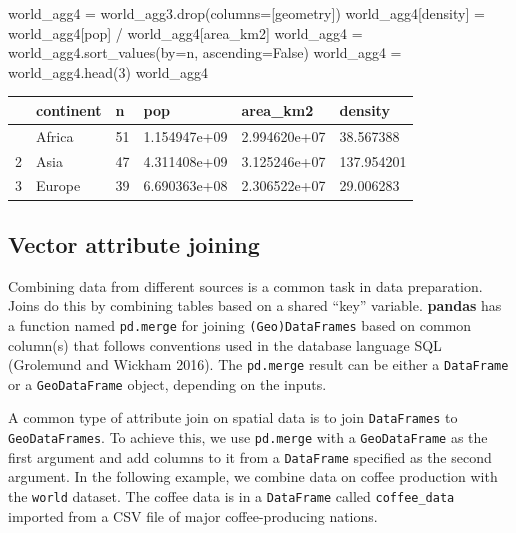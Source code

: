 \documentclass[
  letterpaper,
]{krantz}
\newenvironment{Shaded}{\begin{snugshade}}{\end{snugshade}}
\newcommand{\DecValTok}[1]{\textcolor[rgb]{0.68,0.00,0.00}{#1}}
\newcommand{\NormalTok}[1]{\textcolor[rgb]{0.00,0.23,0.31}{#1}}
\newcommand{\OperatorTok}[1]{\textcolor[rgb]{0.37,0.37,0.37}{#1}}
\newcommand{\StringTok}[1]{\textcolor[rgb]{0.13,0.47,0.30}{#1}}
\newcommand{\VariableTok}[1]{\textcolor[rgb]{0.07,0.07,0.07}{#1}}
\begin{document}
\begin{Shaded}
\begin{Highlighting}[]
\NormalTok{world\_agg4 }\OperatorTok{=}\NormalTok{ world\_agg3.drop(columns}\OperatorTok{=}\NormalTok{[}\StringTok{\textquotesingle{}geometry\textquotesingle{}}\NormalTok{])}
\NormalTok{world\_agg4[}\StringTok{\textquotesingle{}density\textquotesingle{}}\NormalTok{] }\OperatorTok{=}\NormalTok{ world\_agg4[}\StringTok{\textquotesingle{}pop\textquotesingle{}}\NormalTok{] }\OperatorTok{/}\NormalTok{ world\_agg4[}\StringTok{\textquotesingle{}area\_km2\textquotesingle{}}\NormalTok{]}
\NormalTok{world\_agg4 }\OperatorTok{=}\NormalTok{ world\_agg4.sort\_values(by}\OperatorTok{=}\StringTok{\textquotesingle{}n\textquotesingle{}}\NormalTok{, ascending}\OperatorTok{=}\VariableTok{False}\NormalTok{)}
\NormalTok{world\_agg4 }\OperatorTok{=}\NormalTok{ world\_agg4.head(}\DecValTok{3}\NormalTok{)}
\NormalTok{world\_agg4}
\end{Highlighting}
\end{Shaded}

\begin{longtable}[]{@{}llllll@{}}
\toprule\noalign{}
& continent & n & pop & area\_km2 & density \\
\midrule\noalign{}
\endhead
\bottomrule\noalign{}
\endlastfoot
0 & Africa & 51 & 1.154947e+09 & 2.994620e+07 & 38.567388 \\
2 & Asia & 47 & 4.311408e+09 & 3.125246e+07 & 137.954201 \\
3 & Europe & 39 & 6.690363e+08 & 2.306522e+07 & 29.006283 \\
\end{longtable}

\subsection{Vector attribute
joining}\label{sec-vector-attribute-joining}

Combining data from different sources is a common task in data
preparation. Joins do this by combining tables based on a shared ``key''
variable. \textbf{pandas} has a function named \texttt{pd.merge} for
joining \texttt{(Geo)DataFrames} based on common column(s) that follows
conventions used in the database language SQL (Grolemund and Wickham
2016). The \texttt{pd.merge} result can be either a \texttt{DataFrame}
or a \texttt{GeoDataFrame} object, depending on the inputs.

A common type of attribute join on spatial data is to join
\texttt{DataFrames} to \texttt{GeoDataFrames}. To achieve this, we use
\texttt{pd.merge} with a \texttt{GeoDataFrame} as the first argument and
add columns to it from a \texttt{DataFrame} specified as the second
argument. In the following example, we combine data on coffee production
with the \texttt{world} dataset. The coffee data is in a
\texttt{DataFrame} called \texttt{coffee\_data} imported from a CSV file
of major coffee-producing nations.
\end{document}
